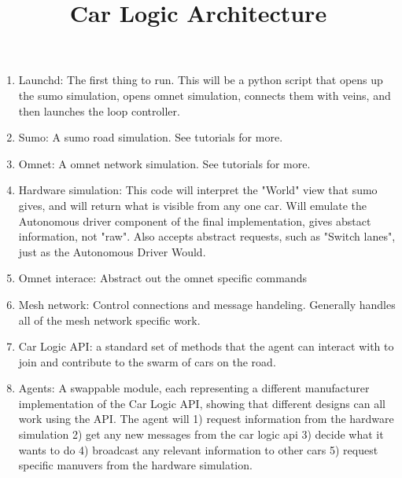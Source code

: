 \documentclass[11pt]{article}
\begin{document}
	\title{
		\textbf{Car Logic Architecture}
	}
	\date{}
	\maketitle


\begin{center}
\end{center}

	\begin{enumerate}
		\item Launchd: The first thing to run. This will be a python script
			that opens up the sumo simulation, opens omnet simulation, connects them
			with veins, and then launches the loop controller.
		\item Sumo: A sumo road simulation. See tutorials for more.
		\item Omnet: A omnet network simulation. See tutorials for more.
		\item Hardware simulation: This code will interpret the "World" view that
			sumo gives, and will return what is visible from any one car. Will emulate
			the Autonomous driver component of the final implementation, gives abstact
			information, not "raw". Also accepts abstract requests, such as "Switch lanes",
			just as the Autonomous Driver Would.
		\item Omnet interace: Abstract out the omnet specific commands
		\item Mesh network: Control connections and message handeling. Generally
			handles all of the mesh network specific work.
		\item Car Logic API: a standard set of methods that the agent can interact
			with to join and contribute to the swarm of cars on the road.
		\item Agents: A swappable module, each representing a different manufacturer
			implementation of the Car Logic API, showing that different designs can
			all work using the API. The agent will 1) request information from the
			hardware simulation 2) get any new messages from the car logic api 3) decide
			what it wants to do 4) broadcast any relevant information to other cars
			5) request specific manuvers from the hardware simulation.
	\end{enumerate}
\end{document}
